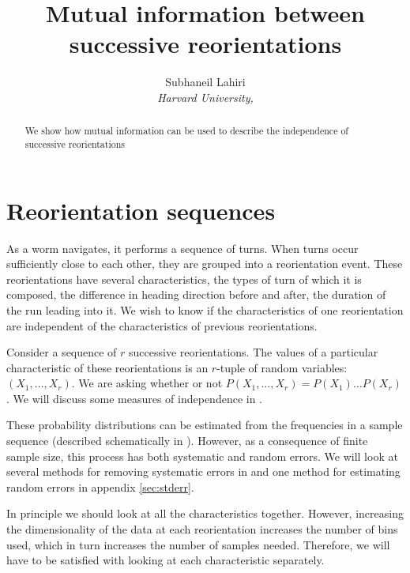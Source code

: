 \documentclass[12pt]{article}
\title{Mutual information between successive reorientations}
\author{Subhaneil Lahiri
\\
%
%
\small{\emph{Harvard University,}}
%
}
\begin{document}
\maketitle





\begin{abstract}
  We show how mutual information can be used to describe the independence of successive reorientations
\end{abstract}



\section{Reorientation sequences}\label{sec:reoseq}

As a worm navigates, it performs a sequence of turns. When turns occur sufficiently close to each other, they are grouped into a reorientation event. These reorientations have several characteristics, \eg the types of turn of which it is composed, the difference in heading direction before and after, the duration of the run leading into it. We wish to know if the characteristics of one reorientation are independent of the characteristics of previous reorientations.

Consider a sequence of $r$ successive reorientations. The values of a particular characteristic of these reorientations is an $r$-tuple of random variables: $(X_1,\ldots,X_r)$. We are asking whether or not $P(X_1,\ldots,X_r) = P(X_1)\ldots P(X_r)$. We will discuss some measures of independence in .

These probability distributions can be estimated from the frequencies in a sample sequence (described schematically in ). However, as a consequence of finite sample size, this process has both systematic and random errors. We will look at several methods for removing systematic errors in  and one method for estimating random errors in appendix \ref{sec:stderr}.

In principle we should look at all the characteristics together. However, increasing the dimensionality of the data at each reorientation increases the number of bins used, which in turn increases the number of samples needed. Therefore, we will have to be satisfied with looking at each characteristic separately.
\end{document}
